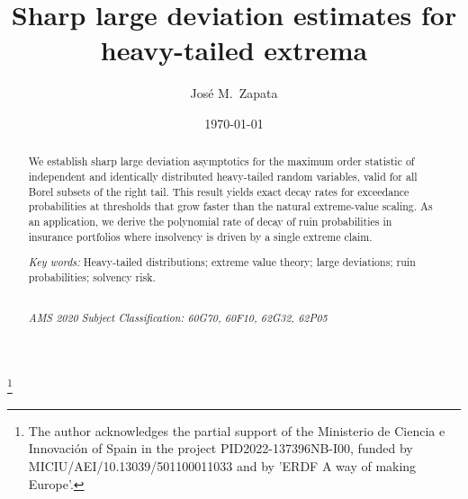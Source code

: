 \documentclass[11pt,reqno]{amsart}
\theoremstyle{definition}
\theoremstyle{remark}
\numberwithin{equation}{section}
\begin{document}
	
	
	\title[Sharp large deviation estimates  for heavy-tailed extrema]{Sharp large deviation estimates  for heavy-tailed extrema}

	
		\author{Jos\'e M.~Zapata}
	\address{Universidad de Murcia.  Dpto. de Estadística e Investigación Operativa,  30100 Espinardo, Murcia, Spain}
	
\thanks{The author acknowledges the partial support of the Ministerio de Ciencia e Innovación
of Spain in the project PID2022-137396NB-I00, funded by MICIU/AEI/10.13039/501100011033
and by 'ERDF A way of making Europe'.}

    
		\date{\today}
	
	

	\subjclass[2010]{}
	
	
	
\begin{abstract} 
We establish sharp large deviation asymptotics for the maximum order statistic of independent and identically distributed heavy-tailed random variables, valid for all Borel subsets of the right tail. This result yields exact  decay rates for exceedance probabilities at thresholds that grow faster than the natural extreme-value scaling. As an application, we derive the polynomial rate of decay of ruin probabilities in insurance portfolios where insolvency is driven by a single extreme claim.

\smallskip\noindent
 \emph{Key words:} Heavy-tailed distributions; extreme value theory; large deviations; ruin probabilities;
solvency risk.
   
   \mbox{}\\
 		\smallskip
		\noindent \emph{AMS 2020 Subject Classification: 60G70, 60F10, 62G32, 62P05} 
	\end{abstract}
	
	
	\maketitle
	
	\setcounter{tocdepth}{1}
\end{document}
